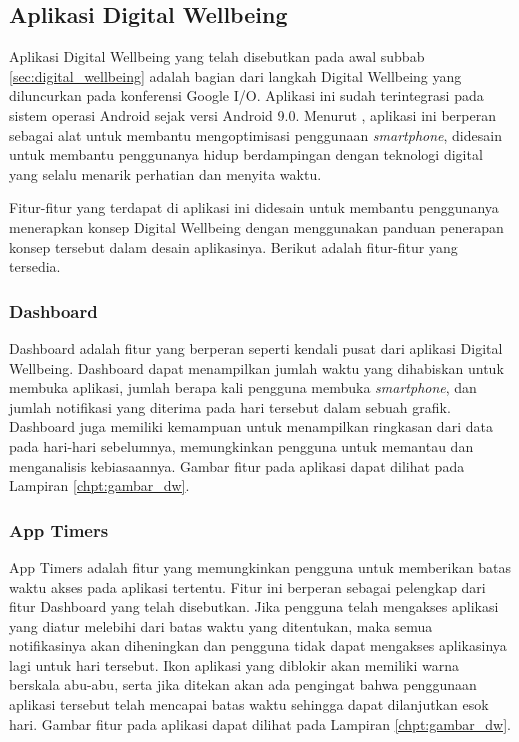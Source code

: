 \subsection{Aplikasi Digital Wellbeing}

Aplikasi Digital Wellbeing yang telah disebutkan pada awal subbab \ref{sec:digital_wellbeing} adalah bagian dari langkah Digital Wellbeing yang diluncurkan pada konferensi Google I/O. Aplikasi ini sudah terintegrasi pada sistem operasi Android sejak versi Android 9.0. \parencite{google2021dwsupport} Menurut \textcite{8976353}, aplikasi ini berperan sebagai alat untuk membantu mengoptimisasi penggunaan \textit{smartphone}, didesain untuk membantu penggunanya hidup berdampingan dengan teknologi digital yang selalu menarik perhatian dan menyita waktu.

Fitur-fitur yang terdapat di aplikasi ini didesain untuk membantu penggunanya menerapkan konsep Digital Wellbeing dengan menggunakan panduan penerapan konsep tersebut dalam desain aplikasinya. Berikut adalah fitur-fitur yang tersedia.


\subsubsection{Dashboard}
Dashboard adalah fitur yang berperan seperti kendali pusat dari aplikasi Digital Wellbeing. Dashboard dapat menampilkan jumlah waktu yang dihabiskan untuk membuka aplikasi, jumlah berapa kali pengguna membuka \textit{smartphone}, dan jumlah notifikasi yang diterima pada hari tersebut dalam sebuah grafik. \parencite{android2019digitalwellbeing} Dashboard juga memiliki kemampuan untuk menampilkan ringkasan dari data pada hari-hari sebelumnya, memungkinkan pengguna untuk memantau dan menganalisis kebiasaannya. Gambar fitur pada aplikasi dapat dilihat pada Lampiran \ref{chpt:gambar_dw}.

\subsubsection{App Timers}
App Timers adalah fitur yang memungkinkan pengguna untuk memberikan batas waktu akses pada aplikasi tertentu. Fitur ini berperan sebagai pelengkap dari fitur Dashboard yang telah disebutkan. Jika pengguna telah mengakses aplikasi yang diatur melebihi dari batas waktu yang ditentukan, maka semua notifikasinya akan diheningkan dan pengguna tidak dapat mengakses aplikasinya lagi untuk hari tersebut. \parencite{android2019digitalwellbeing} Ikon aplikasi yang diblokir akan memiliki warna berskala abu-abu, serta jika ditekan akan ada pengingat bahwa penggunaan aplikasi tersebut telah mencapai batas waktu sehingga dapat dilanjutkan esok hari. Gambar fitur pada aplikasi dapat dilihat pada Lampiran \ref{chpt:gambar_dw}.

